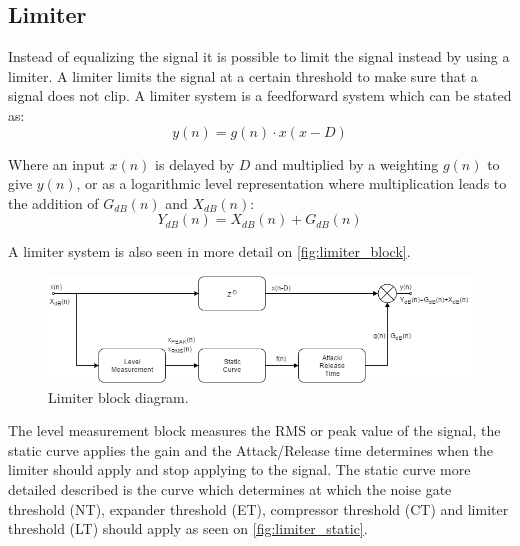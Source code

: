 \subsection*{Limiter}
Instead of equalizing the signal it is possible to limit the signal instead by using a limiter. A limiter limits the signal at a certain threshold to make sure that a signal does not clip. A limiter system is a feedforward system which can be stated as:
\begin{equation}
y(n) = g(n)\cdot x(x-D)
\end{equation}

%  
Where an input $x(n)$ is delayed by $D$ and multiplied by a weighting $g(n)$ to give $y(n)$, or as a logarithmic level representation where multiplication leads to the addition of $G_{dB}(n)$ and $X_{dB}(n)$:
\begin{equation}
Y_{dB}(n) = X_{dB}(n) + G_{dB}(n)
\end{equation}

A limiter system is also seen in more detail on \autoref{fig:limiter_block}.

\begin{figure}[H]
\centering
\includegraphics[width=1\textwidth]{figures/Limiter_block.png}
\caption{Limiter block diagram.}
\label{fig:limiter_block}
\end{figure}   


The level measurement block measures the RMS or peak value of the signal, the static curve applies the gain and the Attack/Release time determines when the limiter should apply and stop applying to the signal. The static curve more detailed described is the curve which determines at which the noise gate threshold (NT), expander threshold (ET), compressor threshold (CT) and limiter threshold (LT) should apply as seen on \autoref{fig:limiter_static}. 

